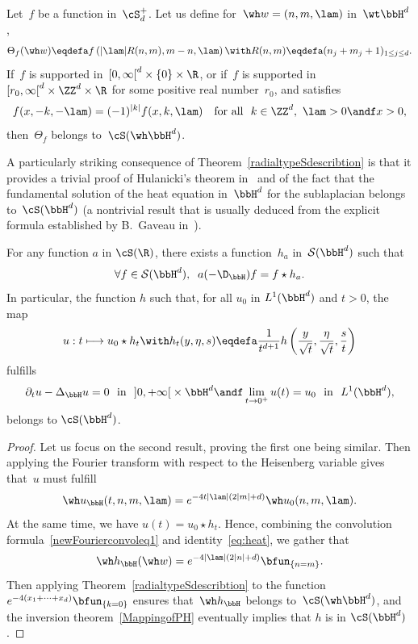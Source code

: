 \begin{theo}\label{radialtypeSdescribtion}
Let~$f$ be a function in~$\cS^+_d$. Let us define for~$\wh w=(n,m,\lam)$ in~$\wt \bbH^d$,
\[
\Theta_f(\wh w)\eqdefa f\left (|\lam|R(n,m),m-n,\lam\right)\with R(n,m)\eqdefa (n_j+m_j+1)_{1\leq j\leq d}.
\]
If~$f$ is supported in~$[0,\infty\mathclose{[}^d\times \{0\}\times\R$, or if~$f$ is supported in~$[r_0,\infty\mathclose{[}^d\times \ZZ^d\times \R$ for some positive real number~$r_0$, and satisfies
\begin{equation}\label{eq:fsym}
f(x, -k, -\lam) = (-1)^{|k|}f(x, k, \lam)\quad\hbox{for all }\ k\in\ZZ^d,\ \lam>0\andf x>0,
\end{equation}
then~$\Theta_f$ belongs to~$\cS(\wh\bbH^d)$.
\end{theo}

A particularly striking consequence of Theorem~\ref{radialtypeSdescribtion} is that it provides a trivial proof of Hulanicki's theorem in~\cite{hula} and of the fact that the fundamental solution of the heat equation in~$\bbH^d$ for the sublaplacian belongs to~$\cS(\bbH^d)$ (a nontrivial result that is usually deduced from the explicit formula established by B.~Gaveau in~\cite{gaveau}).

\begin{coro}
For any function $a$ in $\cS(\R)$, there exists a function~$h_a$ in~$ \mathcal{S}(\bbH^d)$ such that
\[
\forall f\in \mathcal{S}(\bbH^d),\;\; a(-\D_{\bbH})f=f \star h_a.
\]
In particular, the function $h$ such that, for all $u_0$ in $L^1(\bbH^d)$ and $t>0$, the map
\[
u: t\longmapsto u_0\star h_t\with h_t(y,\eta,s)\eqdefa \frac{1}{t^{d+1}} h\left(\frac{y}{\sqrt{t}}, \frac{\eta}{\sqrt{t}}, \frac s t\right)
\]
fulfills
\[
\partial_t u-\Delta_\bbH u=0\ \hbox{ in }\ \mathopen{]}0,+\infty\mathclose{[}\times\bbH^d\andf\lim_{t\to0^+} u(t)= u_0\ \hbox{ in }\ L^1(\bbH^d),
\]
belongs to $\cS(\bbH^d)$.
\end{coro}

\begin{proof}
Let us focus on the second result, proving the first one being similar. Then applying the Fourier transform with respect to the Heisenberg variable gives that~$u$ must fulfill
\begin{equation}\label{eq:heat}
\wh u_\bbH(t,n,m,\lam) = e^{-4t|\lam|(2|m|+d)} \wh u_0(n,m,\lam).
\end{equation}
At the same time, we have $u(t) = u_0\star h_t$. Hence, combining the convolution formula~\eqref{newFourierconvoleq1} and identity~\eqref{eq:heat}, we gather that
\[
\wh h_\bbH (\wh w) = e^{-4|\lam|(2|n|+d)} \bfun_{\{n=m\}}.
\]
Then applying Theorem~\ref{radialtypeSdescribtion} to the function~$e^{-4(x_1+\dots+x_d)}\bfun_{\{k=0\}}$ ensures that~$\wh h_\bbH$ belongs to~$\cS(\wh\bbH^d)$, and the inversion theorem~\ref{MappingofPH} eventually implies that $h$ is in $\cS(\bbH^d)$.
\end{proof}

